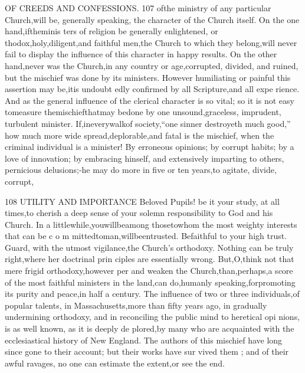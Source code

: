 \documentclass[
]{book}
\begin{document}
OF CREEDS AND CONFESSIONS.
107
ofthe ministry of any particular Church,will
be, generally speaking, the character of the
Church itself. On the one hand,iftheminis
ters of religion be generally enlightened, or thodox,holy,diligent,and faithful men,the
Church to which they belong,will never fail to display the influence of this character in happy results.
On the other hand,never was
the Church,in any country or age,corrupted, divided, and ruined, but the mischief was done by its ministers. However humiliating or painful this assertion may be,itis undoubt
edly confirmed by all Scripture,and all expe
rience. And as the general influence of the clerical character is so vital; so it is not easy
tomeasure themischiefthatmay bedone by
one unsound,graceless, imprudent, turbulent minister. If,ineverywalkof society,``one
sinner destroyeth much good,'' how much more wide spread,deplorable,and fatal is the
mischief, when the criminal individual is a minister! By erroneous opinions; by corrupt habits; by a love of innovation; by embracing hinself, and extensively imparting to others, pernicious delusions;-he may do more in five or ten years,to agitate, divide, corrupt,

108 UTILITY AND IMPORTANCE
Beloved Pupils! be it your study, at all times,to cherish a deep sense of your solemn responsibility to God and his Church. In a littlewhile,youwillbeamong thosetowhom the most weighty interests that can be c o m mittedtoman,willbeentrusted. Befaithful to your high trust. Guard, with the utmost
vigilance,the Church's orthodoxy. Nothing can be truly right,where her doctrinal prin ciples are essentially wrong. But,O,think not that mere frigid orthodoxy,however per
and weaken the Church,than,perhaps,a score of the most faithful ministers in the land,can
do,humanly speaking,forpromoting its purity and peace,in half a century. The influence
of two or three individuals,of popular talents, in Massachusetts,more than fifty years ago,
in gradually undermining orthodoxy, and in
reconciling the public mind to heretical opi
nions, is as well known, as it is deeply de
plored,by many who are acquainted with the
ecclesiastical history of New England. The authors of this mischief have long since gone
to their account; but their works have sur vived them ; and of their awful ravages, no one can estimate the extent,or see the end.
\end{document}
